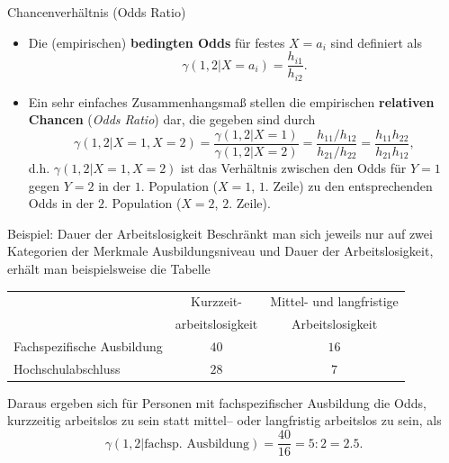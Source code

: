 \documentclass[
  10pt,
  ignorenonframetext,
]{beamer}
\providecommand{\tightlist}{%
  \setlength{\itemsep}{0pt}\setlength{\parskip}{0pt}}
\begin{document}
\begin{frame}{Chancenverhältnis (Odds Ratio)}
\label{chancenverhuxe4ltnis-odds-ratio}
\begin{itemize}
\tightlist
\item
  Die (empirischen) \textbf{bedingten Odds} für festes \(X=a_i\) sind
  definiert als \begin{displaymath}
   \gamma(1,2|X=a_i) = \frac{h_{i1}}{h_{i2}}.
    \end{displaymath}
\item
  Ein sehr einfaches Zusammenhangsmaß stellen die empirischen
  \textbf{relativen Chancen} (\emph{Odds Ratio}) dar, die gegeben sind
  durch \begin{displaymath}
   \gamma(1,2|X=1,X=2) = \frac{\gamma(1,2|X=1)}{\gamma(1,2|X=2)} =
   \frac{h_{11}/h_{12}} {h_{21}/h_{22}} = \frac{h_{11}h_{22}}{h_{21}h_{12}},
    \end{displaymath} d.h. \(\gamma(1,2|X=1,X=2)\) ist das Verhältnis
  zwischen den Odds für \(Y=1\) gegen \(Y=2\) in der \(1.\) Population
  (\(X=1\), \(1.\) Zeile) zu den entsprechenden Odds in der \(2.\)
  Population (\(X=2\), \(2.\) Zeile).
\end{itemize}
\end{frame}

\begin{frame}{Beispiel: Dauer der Arbeitslosigkeit}
\label{beispiel-dauer-der-arbeitslosigkeit}
Beschränkt man sich jeweils nur auf zwei Kategorien der Merkmale
Ausbildungsniveau und Dauer der Arbeitslosigkeit, erhält man
beispielsweise die Tabelle

\begin{center}
\small
\begin{tabular}[b]{lcc}
\multicolumn{1}{c}{}
& Kurzzeit-
  & Mittel- und langfristige\\
\multicolumn{1}{c}{}
& arbeitslosigkeit
  & Arbeitslosigkeit\\\cline{2-3}
\multicolumn{1}{l|}{Fachspezifische Ausbildung}
& $40$ & \multicolumn{1}{c|}{$16$} \\
\multicolumn{1}{l|}{Hochschulabschluss}
& $28$ & \multicolumn{1}{c|}{$7$}\\\cline{2-3}
\end{tabular}
\end{center}

\medskip Daraus ergeben sich für Personen mit fachspezifischer
Ausbildung die Odds, kurzzeitig arbeitslos zu sein statt mittel-- oder
langfristig arbeitslos zu sein, als \begin{displaymath}
\gamma(1,2|\text{fachsp. Ausbildung}) = \frac{40}{16} = 5:2 = 2.5.
\end{displaymath}
\end{frame}
\end{document}
